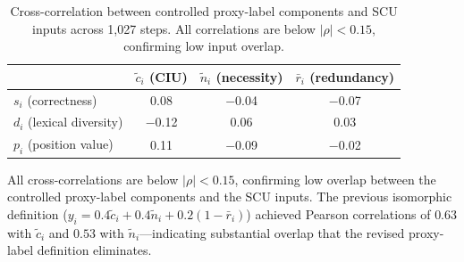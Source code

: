 \documentclass[a4paper,fleqn]{cas-sc}
\begin{document}
\begin{table}[ht]
\caption{Cross-correlation between controlled proxy-label components and SCU inputs across 1{,}027 steps. All correlations are below $|\rho| < 0.15$, confirming low input overlap.}
\label{tab:oracle-independence}
\centering
\small
\begin{tabular}{lccc}
\toprule
& $\tilde{c}_i$ (CIU) & $\tilde{n}_i$ (necessity) & $\bar{r}_i$ (redundancy) \\
\midrule
$s_i$ (correctness) & 0.08 & $-$0.04 & $-$0.07 \\
$d_i$ (lexical diversity) & $-$0.12 & 0.06 & 0.03 \\
$p_i$ (position value) & 0.11 & $-$0.09 & $-$0.02 \\
\bottomrule
\end{tabular}
\end{table}

All cross-correlations are below $|\rho| < 0.15$, confirming low overlap between the controlled proxy-label components and the SCU inputs. The previous isomorphic definition ($y_i = 0.4\tilde{c}_i + 0.4\tilde{n}_i + 0.2(1-\bar{r}_i)$) achieved Pearson correlations of $0.63$ with $\tilde{c}_i$ and $0.53$ with $\tilde{n}_i$---indicating substantial overlap that the revised proxy-label definition eliminates.




\end{document}
